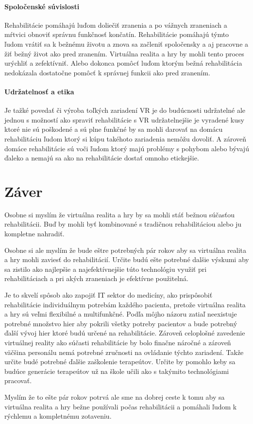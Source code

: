 \documentclass[10pt,twoside,slovak,a4paper]{article}
\begin{document}
\paragraph{Spoločenské súvislosti}
Rehabilitácie pomáhajú luďom doliečiť zranenia a po vážnych zraneniach a mŕtvici obnoviť správnu funkčnosť končatín. Rehabilitácie pomáhajú týmto ľudom vrátiť sa k bežnému životu a znova sa začleniť spoločensky a aj pracovne a žiť bežný život ako pred zranením. Virtuálna realita a hry by mohli tento proces urýchliť a zefektívniť. Alebo dokonca pomôcť luďom ktorým bežná rehabilitácia nedokázala dostatočne pomôcť k správnej funkcii ako pred zranením.

\paragraph{Udržatelnosť a etika}
Je tažké povedať či výroba toľkých zariadení VR je do budúcnosti udržatelné ale jednou s možností ako spraviť rehabilitácie s VR udržatelnejšie je vyradené kusy ktoré nie sú poškodené a sú plne funkčné by sa mohli darovať na domácu rehabilitáciu ľudom ktorý si kúpu takéhoto zariadenia nemôžu dovoliť. A zároveň domáce rehabilitácie sú voči ľudom ktorý majú problémy s pohybom alebo bývajú ďaleko a nemajú sa ako na rehabilitácie dostať omnoho etickejšie.


\section{Záver} 
Osobne si myslím že virtuálna realita a hry by sa mohli stáť bežnou súčasťou rehabilitácii. Buď by mohli byť kombinované s tradičnou rehabilitáciou alebo ju kompletne nahradiť. 

Osobne si ale myslím že bude eštre potrebných pár rokov aby sa virtuálna realita a hry mohli zaviesť do rehabilitácií. Určite budú ešte potrebné dalšie výskumi aby sa zistilo ako najlepšie a najefektívnejšie túto technológiu využiť pri rehabilitáciach a pri akých zraneniach je efektívne použitelná. 

Je to skvelí spôsob ako zapojiť IT sektor do medicíny, ako prispôsobiť rehabilitácie individuálnym potrebám každého pacienta, pretože virtuálna realita a hry sú veľmi flexibilné a multifunkčné.  Podľa môjho názoru zatiaľ neexistuje potrebné množstvo hier aby pokrili všetky potreby pacientov a bude potrebný ďalší vývoj hier ktoré budú určené na rehabilitácie. Zároveň celoplošné zavedenie virtuálnej reality ako súčasti rehabilitácie by bolo finačne náročné a zároveň väčšina personálu nemá potrebné zručnosti na ovládanie týchto zariadení. Takže určite budé potrebné ďalšie zaškolenie terapeútov. Určite by pomohlo keby sa budúce generácie terapeútov už na škole učili ako s takýmito technológiami pracovať. 

Myslím že to ešte pár rokov potrvá ale sme na dobrej ceste k tomu aby sa virtuálna realita a hry bežne používali počas rehabilitácii a pomáhali ľudom k rýchlemu a kompletnému zotaveniu.


\end{document}
